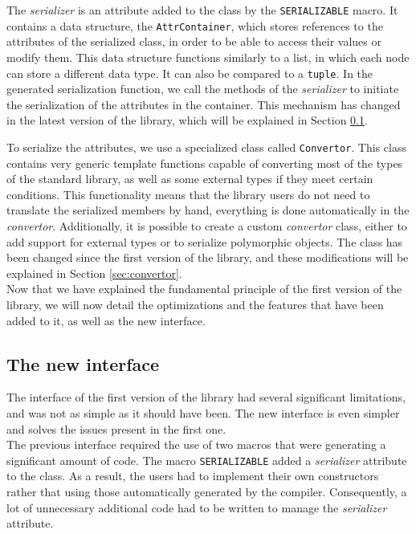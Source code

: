 The \textit{serializer} is an attribute added to the class by the
\texttt{SERIALIZABLE} macro. It contains a data structure, the
\texttt{AttrContainer}, which stores references to the attributes of the
serialized class, in order to be able to access their values or modify them.
This data structure functions similarly to a list, in which each node can store
a different data type. It can also be compared to a \texttt{tuple}. In the
generated serialization function, we call the methods of the \textit{serializer}
to initiate the serialization of the attributes in the container. This mechanism
has changed in the latest version of the library, which will be explained in
Section \ref{sec:sernewinterface}.

To serialize the attributes, we use a specialized class called
\texttt{Convertor}. This class contains very generic template functions
capable of converting most of the types of the standard library, as well as some
external types if they meet certain conditions. This functionality means that
the library users do not need to translate the serialized members by hand,
everything is done automatically in the \textit{convertor}. Additionally, it is
possible to create a custom \textit{convertor} class, either to add support for
external types or to serialize polymorphic objects. The class has been changed
since the first version of the library, and these modifications will be
explained in Section \ref{sec:convertor}.\\

Now that we have explained the fundamental principle of the first version of the
library, we will now detail the optimizations and the features that have been
added to it, as well as the new interface.

\subsection{The new interface}
\label{sec:sernewinterface}

The interface of the first version of the library had several significant
limitations, and was not as simple as it should have been. The new interface is
even simpler and solves the issues present in the first one.\\

The previous interface required the use of two macros that were generating a
significant amount of code. The macro \texttt{SERIALIZABLE} added a
\textit{serializer} attribute to the class. As a result, the users had to
implement their own constructors rather that using those automatically generated
by the compiler. Consequently, a lot of unnecessary additional code had to be
written to manage the \textit{serializer} attribute.

